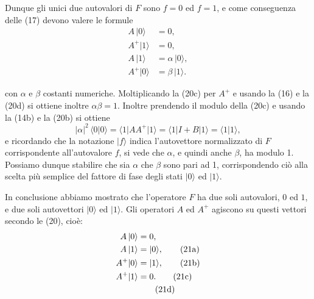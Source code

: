 \documentclass[11pt, a4paper]{book}
\numberwithin{equation}{section}
\begin{document}
Dunque gli unici due autovalori di $F$ sono $f=0$ ed $f=1$, e come
conseguenza delle (17) devono valere le formule
\begin{align}
A\,|0\rangle   &= 0,            \tag{20a} \\
A^+|1\rangle   &= 0,            \tag{20b} \\
A\,|1\rangle   &= \alpha\,|0\rangle, \tag{20c} \\
A^+|0\rangle   &= \beta\,|1\rangle.  \tag{20d}
\end{align}


con $\alpha$ e $\beta$ costanti numeriche. Moltiplicando la (20c) per
$A^+$ e usando la (16) e la (20d) si ottiene inoltre $\alpha\beta = 1$.
Inoltre prendendo il modulo della (20c) e usando la (14b) e la (20b) si
ottiene
\[
|\alpha|^2\,\langle 0|0\rangle
= \langle 1|AA^+|1\rangle = \langle 1|I+B|1\rangle = \langle 1|1\rangle, %
\]
e ricordando che la notazione $|f\rangle$ indica l'autovettore normalizzato
di $F$ corrispondente all'autovalore $f$, si vede che $\alpha$, e quindi
anche $\beta$, ha modulo 1. Possiamo dunque stabilire che sia $\alpha$ che
$\beta$ sono pari ad 1, corrispondendo ciò alla scelta più semplice del
fattore di fase degli stati $|0\rangle$ ed $|1\rangle$.

In conclusione abbiamo mostrato che l'operatore $F$ ha due soli
autovalori, $0$ ed $1$, e due soli autovettori $|0\rangle$ ed $|1\rangle$.
Gli operatori $A$ ed $A^+$ agiscono su questi vettori secondo le (20),
cioè:
\begin{align}
A\,|0\rangle   &= 0,              \notag \\
A\,|1\rangle   &= |0\rangle,      \tag{21a} \\
A^+|0\rangle   &= |1\rangle,      \tag{21b} \\
A^+|1\rangle   &= 0.              \tag{21c} \\
                &                  \tag{21d}
\end{align}
\end{document}
